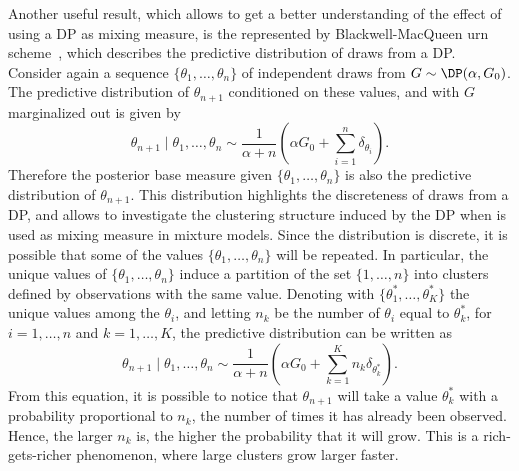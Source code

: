 Another useful result, which allows to get a better understanding of the effect of using a DP as mixing measure, is the represented by Blackwell-MacQueen urn scheme~\citep{blackwell1973}, which describes the predictive distribution of draws from a DP. Consider again a sequence $\{\theta_1,\dots,\theta_n\}$ of independent draws from $G\sim\DP(\alpha,G_0)$. The predictive distribution of $\theta_{n+1}$ conditioned on these values, and with $G$ marginalized out is given by 
\begin{equation*}
\theta_{n+1} \mid \theta_1,\dots,\theta_n \sim \frac{1}{\alpha + n} \left( \alpha G_0 + \sum_{i=1}^n \delta_{\theta_i} \right).
\end{equation*}
Therefore the posterior base measure given $\{\theta_1,\dots,\theta_n\}$ is also the predictive distribution of $\theta_{n+1}$. This distribution highlights the discreteness of draws from a DP, and allows to investigate the clustering structure induced by the DP when is used as mixing measure in mixture models. Since the distribution is discrete, it is possible that some of the values $\{\theta_1,\dots,\theta_n\}$ will be repeated. In particular, the unique values of $\{\theta_1,\dots,\theta_n\}$ induce
a partition of the set $\{1,\dots,n\}$ into clusters defined by observations with the same value.
Denoting with $\{\theta^*_1, \dots, \theta^*_K\}$ the unique values among the $\theta_i$, and letting $n_k$ be the number of $\theta_i$ equal to $\theta^*_k$, for $i=1,\dots,n$ and $k=1,\dots,K$, the predictive distribution can be written as
\begin{equation*}
\theta_{n+1} \mid \theta_1,\dots,\theta_n \sim \frac{1}{\alpha + n} \left( \alpha G_0 + \sum_{k=1}^K n_k \delta_{\theta_k^*} \right).
\end{equation*}
From this equation, it is possible to notice that $\theta_{n+1}$ will take a value $\theta^*_k$ with a probability proportional to $n_k$, the number of times it has already been observed. 
Hence, the larger $n_k$ is, the higher the probability that it will grow. This is a rich-gets-richer phenomenon, where large clusters grow larger faster.

